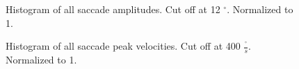\documentclass[10pt,a4paper]{extarticle}
\begin{document}
\begin{figure}
\centering
        \caption[Histogram of saccade amplitude]{Histogram of all saccade amplitudes. Cut off at 12 $^\circ$. Normalized to 1. }
        \label{amp}
\end{figure}    

\begin{figure}
\centering
        \caption[Histogram of peak velocity]{Histogram of all saccade peak velocities. Cut off at 400 $\frac{^\circ} {s}$. Normalized to 1. }
        \label{pv}
\end{figure}

\end{document}
